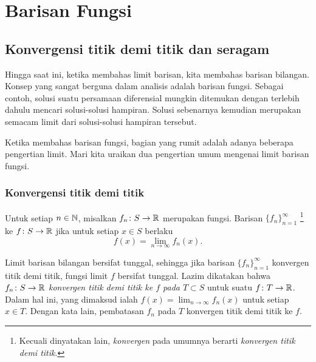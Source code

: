 \chapter{Barisan Fungsi} \label{fs:chapter}


\section{Konvergensi titik demi titik dan seragam}
\label{sec:puconv}



Hingga saat ini, ketika membahas limit barisan, kita membahas
barisan bilangan.
Konsep yang sangat berguna dalam analisis adalah barisan fungsi.
Sebagai contoh, solusi suatu persamaan diferensial
mungkin ditemukan dengan terlebih dahulu mencari solusi-solusi hampiran.
Solusi sebenarnya kemudian merupakan semacam limit dari solusi-solusi hampiran tersebut.

Ketika membahas barisan fungsi,
bagian yang rumit adalah adanya beberapa pengertian limit.
Mari kita uraikan dua pengertian umum
mengenai limit barisan fungsi.

\subsection{Konvergensi titik demi titik}

\begin{defn}
Untuk setiap $n \in {\mathbb{N}}$,
misalkan $f_n \colon S \to {\mathbb{R}}$ merupakan fungsi.  Barisan
$\{ f_n \}_{n=1}^\infty$
\emph{}\footnote{Kecuali dinyatakan lain,
\emph{konvergen} pada umumnya berarti \emph{konvergen titik demi titik}.}
ke $f \colon S \to {\mathbb{R}}$ jika untuk setiap $x
\in S$ berlaku
\begin{equation*}
f(x) =
\lim_{n\to\infty} f_n(x) .
\end{equation*}
\end{defn}

Limit barisan bilangan bersifat tunggal, sehingga jika barisan
$\{ f_n \}_{n=1}^\infty$
konvergen titik demi titik, fungsi limit $f$ bersifat tunggal.
Lazim dikatakan bahwa $f_n \colon S \to {\mathbb{R}}$
\emph{konvergen titik demi titik ke $f$ pada $T \subset S$}
untuk suatu $f \colon T \to {\mathbb{R}}$.  Dalam hal ini, yang dimaksud ialah
$f(x) = \lim_{n\to\infty} f_n(x)$ untuk setiap $x \in T$.  Dengan kata lain,
pembatasan $f_n$ pada $T$ konvergen titik demi titik ke $f$.


